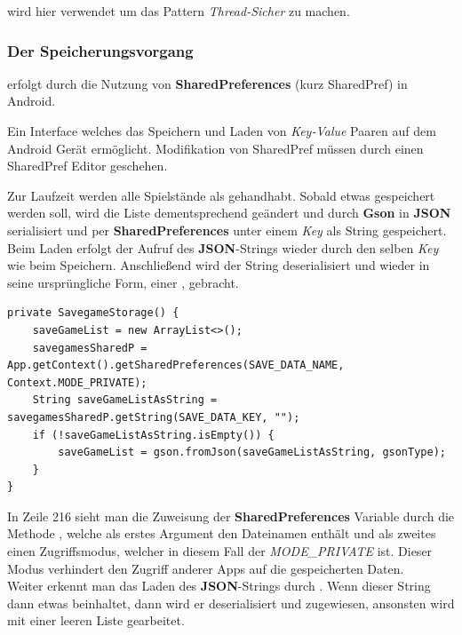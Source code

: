  wird hier verwendet um das Pattern \emph{Thread-Sicher} zu
machen.

\subsubsection{Der Speicherungsvorgang}

erfolgt durch die Nutzung von \textbf{SharedPreferences} (kurz SharedPref) in
Android.

\begin{infobox}[frametitle=SharedPreferences]
Ein Interface welches das Speichern und Laden von \emph{Key-Value} Paaren auf
dem Android Gerät ermöglicht. Modifikation von SharedPref müssen durch einen
SharedPref Editor geschehen.
\end{infobox}
Zur Laufzeit werden alle Spielstände als  gehandhabt.
Sobald etwas gespeichert werden soll, wird die Liste dementsprechend geändert und
durch \textbf{Gson} in \textbf{JSON} serialisiert und per
\textbf{SharedPreferences} unter einem \emph{Key} als String gespeichert. Beim
Laden erfolgt der Aufruf des \textbf{JSON}-Strings wieder durch den selben
\emph{Key} wie beim Speichern. Anschließend wird der String deserialisiert und
wieder in seine ursprüngliche Form, einer , gebracht.

\begin{lstlisting}[caption={SavegameStorage Konstruktor},captionpos=b]
private SavegameStorage() {
	saveGameList = new ArrayList<>();
	savegamesSharedP = App.getContext().getSharedPreferences(SAVE_DATA_NAME, Context.MODE_PRIVATE);
	String saveGameListAsString = savegamesSharedP.getString(SAVE_DATA_KEY, "");
	if (!saveGameListAsString.isEmpty()) {
		saveGameList = gson.fromJson(saveGameListAsString, gsonType);
	}
}
\end{lstlisting}

In Zeile 216 sieht man die Zuweisung der \textbf{SharedPreferences} Variable
durch die Methode , welche als erstes
Argument den Dateinamen enthält und als zweites einen Zugriffsmodus, welcher in
diesem Fall der \emph{MODE\_PRIVATE} ist. Dieser Modus verhindert den Zugriff
anderer Apps auf die gespeicherten Daten.\\ Weiter erkennt man das Laden des
\textbf{JSON}-Strings durch .
Wenn dieser String dann etwas beinhaltet, dann wird er deserialisiert und
zugewiesen, ansonsten wird mit einer leeren Liste gearbeitet.

